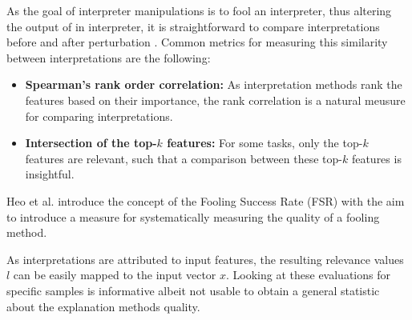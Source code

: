 As the goal of interpreter manipulations is to fool an interpreter, thus altering the output of in interpreter, it is straightforward to compare interpretations before and after perturbation \cite{ghorbani2019interpretation}.
Common metrics for measuring this similarity between interpretations are the following: 
\begin{itemize}
    \item \textbf{Spearman's rank order correlation:} As interpretation methods rank the features based on their importance, the rank correlation \cite{spearman1961proof} is a natural meusure for comparing interpretations. 
    \item \textbf{Intersection of the top-$k$ features: } For some tasks, only the top-$k$ features are relevant, such that a comparison between these top-$k$ features is insightful. 

\end{itemize}


Heo et al. \cite{fooling_nn_interpreters} introduce the concept of the Fooling Success Rate (FSR) with the aim to introduce a measure for systematically measuring the quality of a fooling method. 


As interpretations are attributed to input features, the resulting relevance values $l$ can be easily mapped to the input vector $x$.
Looking at these evaluations for specific samples is informative albeit not usable to obtain a general statistic about the explanation methods quality.
